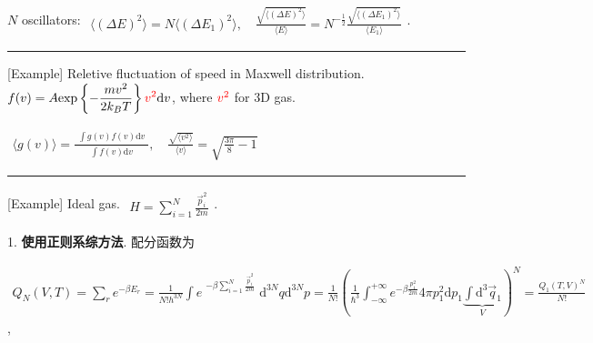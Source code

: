 \documentclass[../../main.tex]{subfiles}
\begin{document}
$N$ oscillators: $\begin{aligned}
    \langle (\Delta E)^{2}\rangle = N\langle(\Delta E_{1})^{2}\rangle,\quad 
    \frac{\sqrt{\langle(\Delta E)^{2}\rangle}}{\langle E\rangle} = N^{-\frac{1}{2}}\frac{\sqrt{\langle(\Delta E_{1})^{2}\rangle}}{\langle E_{1}\rangle}
\end{aligned}$. 

\vspace{0.5em}\hrule\vspace{0.5em}
[Example] Reletive fluctuation of speed in Maxwell distribution. $\begin{aligned}
    f(v) = A\text{exp}\left\{-\frac{mv^{2}}{2k_{B}T}\right\}{\color{red}{v^{2}}}\mathrm{d}v
\end{aligned}$, where ${\color{red}{v^{2}}}$ for 3D gas. 

$\begin{aligned}
    \langle g(v)\rangle = \frac{\begin{aligned}
        \int g(v)f(v)\mathrm{d}v
    \end{aligned}}{\begin{aligned}
        \int f(v)\mathrm{d}v
    \end{aligned}},\quad 
   \frac{\sqrt{\langle v^{2}\rangle}}{\langle v\rangle} = \sqrt{\frac{3\pi}{8}-1}
\end{aligned}$

\vspace{0.5em}\hrule\vspace{0.5em}
[Example] Ideal gas. $\begin{aligned}
    H = \sum_{i=1}^{N}\frac{\vec{p}_{i}^{2}}{2m}
\end{aligned}$. 

1. \textbf{使用正则系综方法}. 配分函数为 

$\begin{aligned}
    Q_{N}(V,T) = \sum_{r}e^{-\beta E_{r}} = \frac{1}{N!h^{3N}}\int e^{\begin{aligned}
        -\beta\sum_{i=1}^{N}\frac{\vec{p}_{i}^{2}}{2m}
    \end{aligned}}\mathrm{d}^{3N}q\mathrm{d}^{3N}p = \frac{1}{N!}\left(\frac{1}{\hbar^{3}}\int_{-\infty}^{+\infty}e^{-\beta\frac{p_{1}^{2}}{2m}}4\pi p_{1}^{2}\mathrm{d}p_{1}\underbrace{\int\mathrm{d}^{3}\vec{q}_{1}}_{V}\right)^{N}
    = \frac{Q_{1}(T,V)^{N}}{N!}
\end{aligned}$, 
\end{document}
